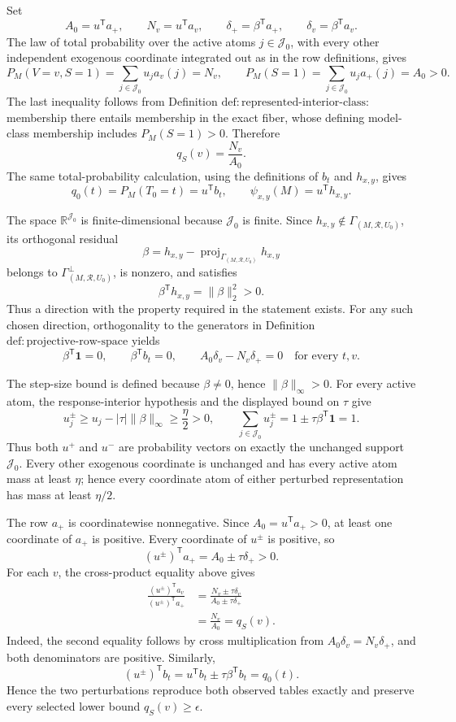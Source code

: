 Set
\[
 A_0=u^{\mathsf T}a_+,
 \qquad N_v=u^{\mathsf T}a_v,
 \qquad \delta_+=\beta^{\mathsf T}a_+,
 \qquad \delta_v=\beta^{\mathsf T}a_v.
\]
The law of total probability over the active atoms \(j\in\mathcal J_0\), with every other independent exogenous coordinate integrated out as in the row definitions, gives
\[
 P_M(V=v,S=1)=\sum_{j\in\mathcal J_0}u_ja_v(j)=N_v,
 \qquad
 P_M(S=1)=\sum_{j\in\mathcal J_0}u_ja_+(j)=A_0>0.
\]
The last inequality follows from Definition \(\mathrm{def{:}represented\text{-}interior\text{-}class}\): membership there entails membership in the exact fiber, whose defining model-class membership includes \(P_M(S=1)>0\). Therefore
\[
 q_S(v)=\frac{N_v}{A_0}.
\]
The same total-probability calculation, using the definitions of \(b_t\) and \(h_{x,y}\), gives
\[
 q_0(t)=P_M(T_0=t)=u^{\mathsf T}b_t,
 \qquad
 \psi_{x,y}(M)=u^{\mathsf T}h_{x,y}.
\]

The space \(\mathbb R^{\mathcal J_0}\) is finite-dimensional because \(\mathcal J_0\) is finite. Since \(h_{x,y}\notin\Gamma_{(M,\mathcal R,U_0)}\), its orthogonal residual
\[
 \beta=h_{x,y}-\operatorname{proj}_{\Gamma_{(M,\mathcal R,U_0)}}h_{x,y}
\]
belongs to \(\Gamma_{(M,\mathcal R,U_0)}^\perp\), is nonzero, and satisfies
\[
 \beta^{\mathsf T}h_{x,y}=\lVert\beta\rVert_2^2>0.
\]
Thus a direction with the property required in the statement exists. For any such chosen direction, orthogonality to the generators in Definition \(\mathrm{def{:}projective\text{-}row\text{-}space}\) yields
\[
 \beta^{\mathsf T}\mathbf 1=0,
 \qquad
 \beta^{\mathsf T}b_t=0,
 \qquad
 A_0\delta_v-N_v\delta_+=0
 \quad\text{for every }t,v.
\]

The step-size bound is defined because \(\beta\ne0\), hence \(\lVert\beta\rVert_\infty>0\). For every active atom, the response-interior hypothesis and the displayed bound on \(\tau\) give
\[
 u_j^{\pm}
 \geq u_j-\lvert\tau\rvert\lVert\beta\rVert_\infty
 \geq\frac{\eta}{2}>0,
 \qquad
 \sum_{j\in\mathcal J_0}u_j^{\pm}
 =1\pm\tau\beta^{\mathsf T}\mathbf 1=1.
\]
Thus both \(u^+\) and \(u^-\) are probability vectors on exactly the unchanged support \(\mathcal J_0\). Every other exogenous coordinate is unchanged and has every active atom mass at least \(\eta\); hence every coordinate atom of either perturbed representation has mass at least \(\eta/2\).

The row \(a_+\) is coordinatewise nonnegative. Since \(A_0=u^{\mathsf T}a_+>0\), at least one coordinate of \(a_+\) is positive. Every coordinate of \(u^\pm\) is positive, so
\[
 (u^\pm)^{\mathsf T}a_+=A_0\pm\tau\delta_+>0.
\]
For each \(v\), the cross-product equality above gives
\[
 \begin{aligned}
 \frac{(u^\pm)^{\mathsf T}a_v}{(u^\pm)^{\mathsf T}a_+}
 &=\frac{N_v\pm\tau\delta_v}{A_0\pm\tau\delta_+}\\
 &=\frac{N_v}{A_0}=q_S(v).
 \end{aligned}
\]
Indeed, the second equality follows by cross multiplication from \(A_0\delta_v=N_v\delta_+\), and both denominators are positive. Similarly,
\[
 (u^\pm)^{\mathsf T}b_t
 =u^{\mathsf T}b_t\pm\tau\beta^{\mathsf T}b_t
 =q_0(t).
\]
Hence the two perturbations reproduce both observed tables exactly and preserve every selected lower bound \(q_S(v)\geq\epsilon\).

